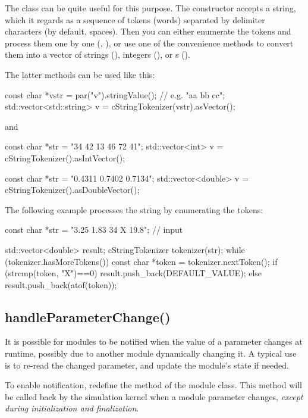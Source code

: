 The  class can be quite useful for this
purpose. The constructor accepts a string, which it regards as
a sequence of tokens (words) separated by delimiter characters
(by default, spaces). Then you can either enumerate the tokens
and process them one by one (, ),
or use one of the  convenience methods to convert
them into a vector of strings (), integers (),
or s ().

The latter methods can be used like this:

\begin{cpp}
const char *vstr = par("v").stringValue(); // e.g. "aa bb cc";
std::vector<std::string> v = cStringTokenizer(vstr).asVector();
\end{cpp}

and

\begin{cpp}
const char *str = "34 42 13 46 72 41";
std::vector<int> v = cStringTokenizer().asIntVector();

const char *str = "0.4311 0.7402 0.7134";
std::vector<double> v = cStringTokenizer().asDoubleVector();
\end{cpp}

The following example processes the string by enumerating the tokens:

\begin{cpp}
const char *str = "3.25 1.83 34 X 19.8"; // input

std::vector<double> result;
cStringTokenizer tokenizer(str);
while (tokenizer.hasMoreTokens())
{
    const char *token = tokenizer.nextToken();
    if (strcmp(token, "X")==0)
        result.push_back(DEFAULT_VALUE);
    else
        result.push_back(atof(token));
}
\end{cpp}

\subsection{handleParameterChange()}
\label{sec:simple-modules:handleParameterChange}

It is possible for modules to be notified when the value of a
parameter changes at runtime, possibly due to another module
dynamically changing it. A typical use is to re-read the changed
parameter, and update the module's state if needed.

To enable notification, redefine the  method
of the module class. This method will be called back by the
simulation kernel when a module parameter changes, \textit{except during
initialization and finalization}.


